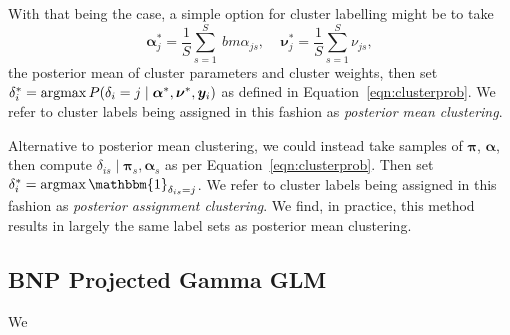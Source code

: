 With that being the case, a simple option for cluster labelling might be to take
    \[
        \bm{\alpha}_j^* = \frac{1}{S}\sum_{s = 1}^S\ bm{\alpha}_{js},\;\;\;\;
        \bm{\nu}_j^* = \frac{1}{S}\sum_{s = 1}^S \nu_{js},
    \]
    the posterior mean of cluster parameters and cluster weights, then set
    $\delta_i^{*} = \operatorname*{argmax} P(\delta_i = j\mid\bm{\alpha}^*,\bm{\nu}^*,\bm{y}_i)$
    as defined in Equation~\eqref{eqn:clusterprob}. We refer to cluster labels
    being assigned in this fashion as \emph{posterior mean clustering}.

Alternative to posterior mean clustering, we could instead take samples of 
    $\bm{\pi}$, $\bm{\alpha}$, then compute 
    $\delta_{is}\mid\bm{\pi}_s,\bm{\alpha}_s$
    as per Equation~\eqref{eqn:clusterprob}.  Then set 
    $\delta_i^{*} = \argmax \mathbbm{1}_{\delta_{is} = j}$.
    We refer to cluster labels being assigned in this fashion as
    \emph{posterior assignment clustering}.  We find, in practice, this method
    results in largely the same label sets as posterior mean clustering.



\subsection{BNP Projected Gamma GLM}
We 



